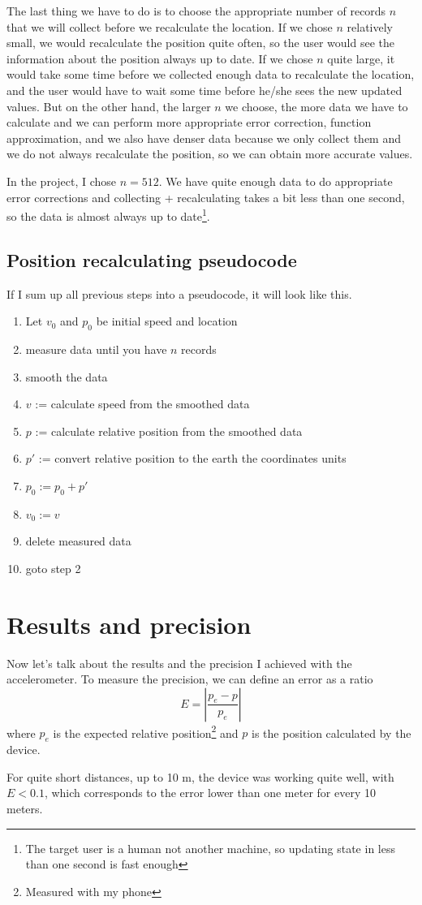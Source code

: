 \documentclass[hidelinks,a4paper]{article}
\begin{document}
The last thing we have to do is to choose the appropriate number of records $n$ that we will collect before we recalculate the location. If we chose $n$ relatively small, we would recalculate the position quite often, so the user would see the information about the position always up to date. If we chose $n$ quite large, it would take some time before we collected enough data to recalculate the location, and the user would have to wait some time before he/she sees the new updated values. But on the other hand, the larger $n$ we choose, the more data we have to calculate and we can perform more appropriate error correction, function approximation, and we also have denser data because we only collect them and we do not always recalculate the position, so we can obtain more accurate values.\par
In the project, I chose $n = 512$. We have quite enough data to do appropriate error corrections and collecting + recalculating takes a bit less than one second, so the data is almost always up to date\footnote{The target user is a human not another machine, so updating state in less than one second is fast enough}.

\subsection{Position recalculating pseudocode}
If I sum up all previous steps into a pseudocode, it will look like this.
\begin{enumerate}
    \item Let $v_0$ and $p_0$ be initial speed and location
    \item measure data until you have $n$ records
    \item smooth the data
    \item $v$ := calculate speed from the smoothed data
    \item $p$ := calculate relative position from the smoothed data
    \item $p'$ := convert relative position to the earth the coordinates units
    \item $p_0 := p_0 + p'$
    \item $v_0 := v$
    \item delete measured data
    \item goto step 2
\end{enumerate}


\section{Results and precision}
Now let's talk about the results and the precision I achieved with the accelerometer. To measure the precision, we can define an error as a ratio
$$
    E = \left|\frac{p_e - p}{p_e}\right|
$$
where $p_e$ is the expected relative position\footnote{Measured with my phone} and $p$ is the position calculated by the device.\par
For quite short distances, up to 10 m, the device was working quite well, with $E < 0.1$, which corresponds to the error lower than one meter for every 10 meters.
\end{document}
